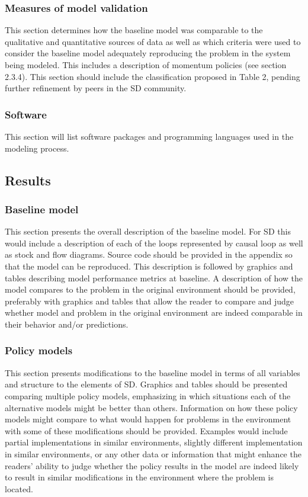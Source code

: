 \documentclass[11pt]{article}
\begin{document}
\subsubsection {Measures of model validation}
This section determines how the baseline model was comparable to the qualitative and quantitative sources of data as well as which criteria were used to consider the baseline model adequately reproducing the problem in the system being modeled.  This includes a description of momentum policies (see section 2.3.4).  This section should include the classification proposed in Table 2, pending further refinement by peers in the SD community.

\subsubsection {Software}
This section will list software packages and programming languages used in the modeling process.

\subsection {Results}

\subsubsection {Baseline model}
This section presents the overall description of the baseline model. For SD this would include a description of each of the loops represented by causal loop as well as stock and flow diagrams. Source code should be provided in the appendix so that the model can be reproduced. This description is followed by graphics and tables describing model performance metrics at baseline. A description of how the model compares to the problem in the original environment should be provided, preferably with graphics and tables that allow the reader to compare and judge whether model and problem in the original environment are indeed comparable in their behavior and/or predictions.

\subsubsection {Policy models}
This section presents modifications to the baseline model in terms of all variables and structure to the elements of SD. Graphics and tables should be presented comparing multiple policy models, emphasizing in which situations each of the alternative models might be better than others. Information on how these policy models might compare to what would happen for problems in the environment with some of these modifications should be provided. Examples would include partial implementations in similar environments, slightly different implementation in similar environments, or any other data or information that might enhance the readers' ability to judge whether the policy results in the model are indeed likely to result in similar modifications in the environment where the problem is located.
\end{document}

